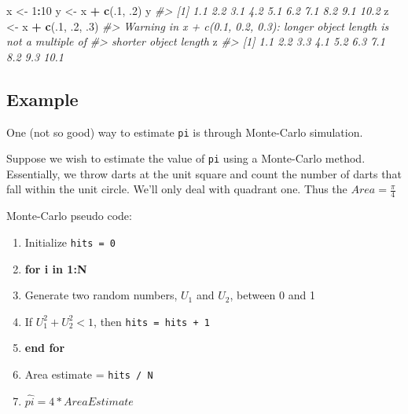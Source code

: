 \documentclass[]{book}
\newenvironment{Shaded}{\begin{snugshade}}{\end{snugshade}}
\newcommand{\KeywordTok}[1]{\textcolor[rgb]{0.13,0.29,0.53}{\textbf{#1}}}
\newcommand{\DecValTok}[1]{\textcolor[rgb]{0.00,0.00,0.81}{#1}}
\newcommand{\StringTok}[1]{\textcolor[rgb]{0.31,0.60,0.02}{#1}}
\newcommand{\CommentTok}[1]{\textcolor[rgb]{0.56,0.35,0.01}{\textit{#1}}}
\newcommand{\OperatorTok}[1]{\textcolor[rgb]{0.81,0.36,0.00}{\textbf{#1}}}
\newcommand{\NormalTok}[1]{#1}
\providecommand{\tightlist}{%
  \setlength{\itemsep}{0pt}\setlength{\parskip}{0pt}}
\theoremstyle{definition}
\theoremstyle{definition}
\theoremstyle{definition}
\theoremstyle{remark}
\begin{document}
\begin{Shaded}
\begin{Highlighting}[]
\NormalTok{x <-}\StringTok{ }\DecValTok{1}\OperatorTok{:}\DecValTok{10}
\NormalTok{y <-}\StringTok{ }\NormalTok{x }\OperatorTok{+}\StringTok{ }\KeywordTok{c}\NormalTok{(.}\DecValTok{1}\NormalTok{, .}\DecValTok{2}\NormalTok{) }
\NormalTok{y}
\CommentTok{#>  [1]  1.1  2.2  3.1  4.2  5.1  6.2  7.1  8.2  9.1 10.2}
\NormalTok{z <-}\StringTok{ }\NormalTok{x }\OperatorTok{+}\StringTok{ }\KeywordTok{c}\NormalTok{(.}\DecValTok{1}\NormalTok{, .}\DecValTok{2}\NormalTok{, .}\DecValTok{3}\NormalTok{)}
\CommentTok{#> Warning in x + c(0.1, 0.2, 0.3): longer object length is not a multiple of}
\CommentTok{#> shorter object length}
\NormalTok{z}
\CommentTok{#>  [1]  1.1  2.2  3.3  4.1  5.2  6.3  7.1  8.2  9.3 10.1}
\end{Highlighting}
\end{Shaded}

\subsection{Example}\label{example}

One (not so good) way to estimate \texttt{pi} is through Monte-Carlo
simulation.

Suppose we wish to estimate the value of \texttt{pi} using a Monte-Carlo
method. Essentially, we throw darts at the unit square and count the
number of darts that fall within the unit circle. We'll only deal with
quadrant one. Thus the \(Area = \frac{\pi}{4}\)

Monte-Carlo pseudo code:

\begin{enumerate}
\def\labelenumi{\arabic{enumi}.}
\tightlist
\item
  Initialize \texttt{hits\ =\ 0}
\item
  \textbf{for i in 1:N}
\item
  Generate two random numbers, \(U_1\) and \(U_2\), between 0 and 1
\item
  If \(U_1^2 + U_2^2 < 1\), then \texttt{hits\ =\ hits\ +\ 1}
\item
  \textbf{end for}
\item
  Area estimate = \texttt{hits\ /\ N}
\item
  \(\hat{pi} = 4 * Area Estimate\)
\end{enumerate}
\end{document}
